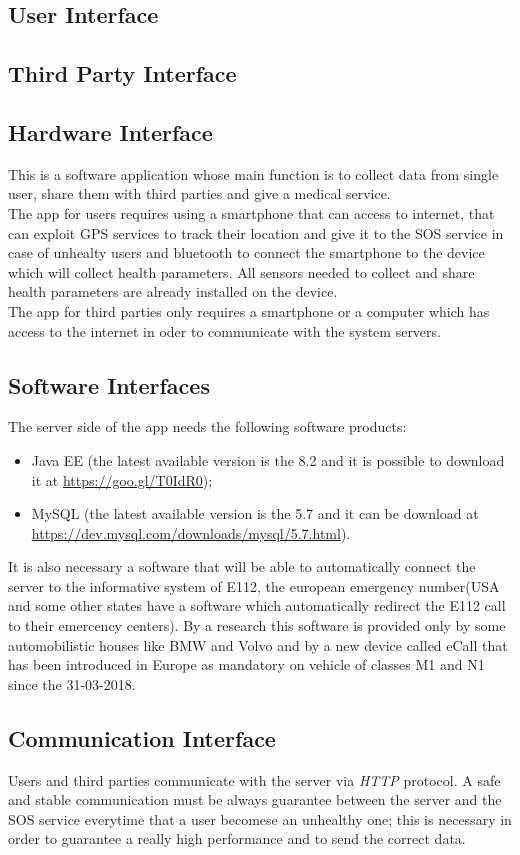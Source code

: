 \subsection{User Interface}


\subsection{Third Party Interface}


\subsection{Hardware Interface}
This is a software application whose main function is to collect data from single user, share them with third parties and give a medical service.\\
The app for users requires using a smartphone that can access to internet, that can exploit GPS services to track their location and give it to the SOS service in case of unhealty users and bluetooth to connect the smartphone to the device which will collect health parameters.
All sensors needed to collect and share health parameters are already installed on the device.\\
The app for third parties only requires a smartphone or a computer which has access to the internet in oder to communicate with the system servers.


\subsection{Software Interfaces}
The server side of the app needs the following software products:
\begin{itemize}
	\item Java EE (the latest available version  is the 8.2 and it is possible to download it at \url{https://goo.gl/T0IdR0});
	\item MySQL (the latest available version is the 5.7 and it can be download at \url{
	https://dev.mysql.com/downloads/mysql/5.7.html}).
\end{itemize}It is also necessary a software that will be able to automatically connect the server to the informative system of E112, the european emergency number(USA and some other states have a software which automatically redirect the E112 call to their emercency centers). By a research this software is provided only by some automobilistic houses like BMW and Volvo and by a new device called eCall that has been introduced in Europe as mandatory on vehicle of classes M1 and N1 since the 31-03-2018.


\subsection{Communication Interface}
Users and third parties communicate with the server via \textit{HTTP} protocol.
A safe and stable communication must be always guarantee between the server and the SOS service everytime that a user becomese an unhealthy one; this is necessary in order to guarantee a really high performance and to send the correct data.
